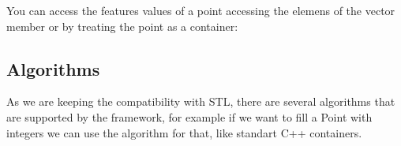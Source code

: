 \documentclass[letterpaper,10pt,english]{sphinxmanual}
\begin{document}
\sphinxAtStartPar
You can access the features values of a point accessing the elemens of the  vector member or by treating the point as a container:

\begin{sphinxVerbatim}[commandchars=\\\{\}]
    

      
      \PYG{p}{[}\PYG{p}{]}  

       
        
\end{sphinxVerbatim}


\subsection{Algorithms}
\label{\detokenize{getting_started/datamanagement:algorithms}}
\sphinxAtStartPar
As we are keeping the compatibility with STL, there are several algorithms that are supported by the framework, for example if we want to
fill a Point with integers we can use the  algorithm for that, like standart C++ containers.

\begin{sphinxVerbatim}[commandchars=\\\{\}]
 

  
\end{sphinxVerbatim}
\end{document}
